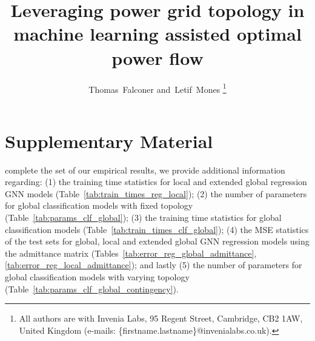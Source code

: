 \documentclass[journal]{IEEEtran}
\begin{document}

\title{Leveraging power grid topology in machine learning assisted optimal power flow}
%
%
%

\author{Thomas~Falconer
        and~Letif~Mones%
\thanks{All authors are with Invenia Labs, 95 Regent Street, Cambridge, CB2 1AW, United Kingdom (e-mails: \{firstname.lastname\}@invenialabs.co.uk).}%
}

\maketitle

\IEEEpeerreviewmaketitle

\section{Supplementary Material}

 complete the set of our empirical results, we provide additional information regarding: (1) the training time statistics for local and extended global regression GNN models (Table~\ref{tab:train_times_reg_local}); (2) the number of parameters for global classification models with fixed topology (Table~\ref{tab:params_clf_global}); (3) the training time statistics for global classification models (Table~\ref{tab:train_times_clf_global}); (4) the MSE statistics of the test sets for global, local and extended global GNN regression models using the admittance matrix (Tables~\ref{tab:error_reg_global_admittance}, \ref{tab:error_reg_local_admittance}); and lastly (5) the number of parameters for global classification models with varying topology (Table~\ref{tab:params_clf_global_contingency}).
\end{document}
